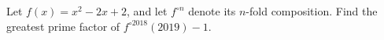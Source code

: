 Let $f(x)=x^2-2x+2$, and let $f^{\circ n}$ denote its $n$-fold composition. Find the greatest prime factor of $f^{\circ2018}(2019)-1$.
